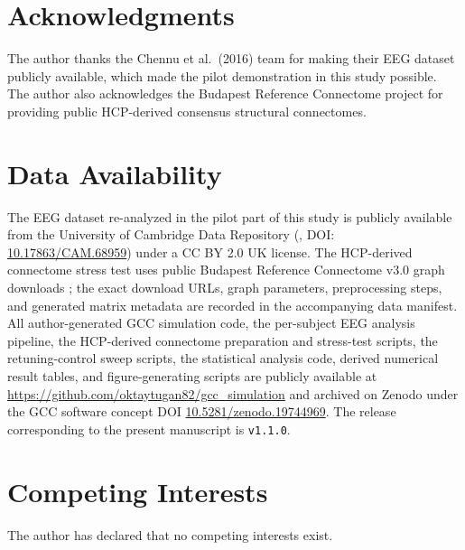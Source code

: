 \documentclass[11pt,a4paper]{article}
\theoremstyle{plain}
\theoremstyle{definition}
\theoremstyle{remark}
\begin{document}
\newpage
\section*{Acknowledgments}

The author thanks the Chennu et al.\ (2016) team for making their EEG dataset publicly available, which made the pilot demonstration in this study possible. The author also acknowledges the Budapest Reference Connectome project for providing public HCP-derived consensus structural connectomes.

\section*{Data Availability}

The EEG dataset re-analyzed in the pilot part of this study is publicly available from the University of Cambridge Data Repository (\citealp{chennu2016}, DOI: \href{https://doi.org/10.17863/CAM.68959}{10.17863/CAM.68959}) under a CC BY 2.0 UK license. The HCP-derived connectome stress test uses public Budapest Reference Connectome v3.0 graph downloads \citep{szalkai2015,szalkai2017}; the exact download URLs, graph parameters, preprocessing steps, and generated matrix metadata are recorded in the accompanying data manifest. All author-generated GCC simulation code, the per-subject EEG analysis pipeline, the HCP-derived connectome preparation and stress-test scripts, the retuning-control sweep scripts, the statistical analysis code, derived numerical result tables, and figure-generating scripts are publicly available at \url{https://github.com/oktaytugan82/gcc_simulation} and archived on Zenodo under the GCC software concept DOI \href{https://doi.org/10.5281/zenodo.19744969}{10.5281/zenodo.19744969}. The release corresponding to the present manuscript is \texttt{v1.1.0}.

\section*{Competing Interests}

The author has declared that no competing interests exist.
\end{document}
